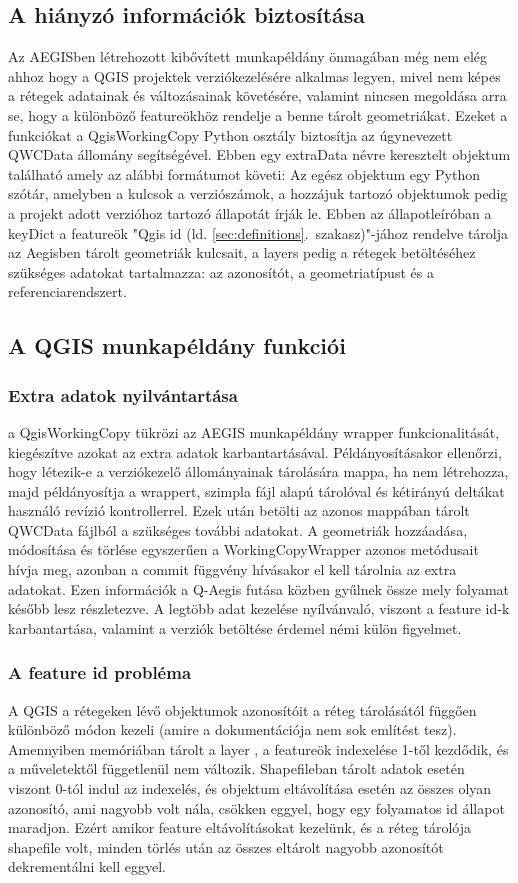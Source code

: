 \subsection{A  hiányzó információk biztosítása}
Az AEGISben létrehozott kibővített munkapéldány önmagában még nem elég ahhoz hogy a QGIS projektek verziókezelésére alkalmas legyen, mivel nem képes a rétegek adatainak és változásainak követésére, valamint nincsen megoldása arra se, hogy a különböző featureökhöz rendelje a benne tárolt geometriákat. Ezeket a funkciókat a QgisWorkingCopy Python osztály biztosítja az úgynevezett QWCData állomány segítségével. Ebben egy extraData névre keresztelt objektum található amely az alábbi formátumot követi:
Az egész objektum egy Python szótár, amelyben a kulcsok a verziószámok, a hozzájuk tartozó objektumok pedig a projekt adott verzióhoz tartozó állapotát írják le. Ebben az állapotleíróban a keyDict a featureök "Qgis id (ld. \ref{sec:definitions}.~szakasz)"-jához rendelve tárolja az Aegisben tárolt geometriák kulcsait, a layers pedig a rétegek betöltéséhez szükséges adatokat tartalmazza: az azonosítót, a geometriatípust és a referenciarendszert.
\subsection{A QGIS munkapéldány funkciói}
\subsubsection{Extra adatok nyilvántartása}
a QgisWorkingCopy tükrözi az AEGIS munkapéldány wrapper funkcionalitását, kiegészítve azokat az extra adatok karbantartásával. Példányosításakor ellenőrzi, hogy létezik-e a verziókezelő állományainak tárolására mappa, ha nem létrehozza, majd példányosítja a wrappert, szimpla fájl alapú tárolóval és kétirányú deltákat használó revízió kontrollerrel. Ezek után betölti az azonos mappában tárolt QWCData fájlból a szükséges további adatokat.
A geometriák hozzáadása, módosítása és törlése egyszerűen a WorkingCopyWrapper azonos metódusait hívja meg, azonban a commit függvény hívásakor el kell tárolnia az extra adatokat. Ezen információk a Q-Aegis futása közben gyűlnek össze mely folyamat később lesz részletezve. A legtöbb adat kezelése nyílvánvaló, viszont a feature id-k karbantartása, valamint a verziók betöltése érdemel némi külön figyelmet.
\subsubsection{A feature id probléma}
A QGIS a rétegeken lévő objektumok azonosítóit a réteg tárolásától függően különböző módon kezeli (amire a dokumentációja nem sok említést tesz). Amennyiben memóriában tárolt a layer , a featureök indexelése 1-től kezdődik, és a műveletektől függetlenül nem változik. Shapefileban tárolt adatok esetén viszont 0-tól indul az indexelés, és objektum eltávolítása esetén az összes olyan azonosító, ami nagyobb volt nála, csökken eggyel, hogy egy folyamatos id állapot maradjon. Ezért amikor feature eltávolításokat kezelünk, és a réteg tárolója shapefile volt, minden törlés után az összes eltárolt nagyobb azonosítót dekrementálni kell eggyel.
